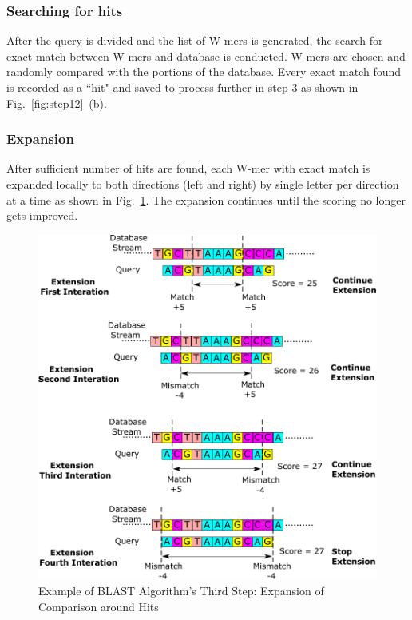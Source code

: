 \subsubsection{\bf Searching for hits}
After the query is divided and the list of W-mers is generated, the search for exact match between W-mers and database is conducted.
W-mers are chosen and randomly compared with the portions of the database. 
Every exact match found is recorded as a ``hit" and saved to process further in step 3 as shown in Fig.~\ref{fig:step12}~(b). 


\subsubsection{\bf Expansion}
After sufficient number of hits are found, each W-mer with exact match is expanded locally to both directions (left and right) by single letter per direction at a time as shown in Fig.~\ref{fig:step3}. 
The expansion continues until the scoring no longer gets improved.
\begin{figure}[t!]
\centering
    \includegraphics[width=\columnwidth]{Figures/Algorithm3.pdf}
    \caption{Example of BLAST Algorithm's Third Step: Expansion of Comparison around Hits} 
    \label{fig:step3}
\end{figure}
